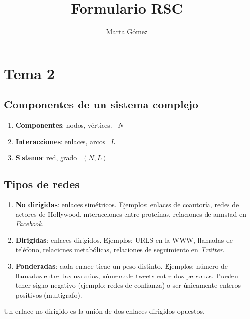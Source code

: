 \documentclass[10pt,spanish, landscape, twocolumn]{article}
\title{Formulario RSC}
\author{Marta Gómez}
\begin{document}
\renewcommand{\tablename}{Tabla}

\section{\textcolor{temados}{Tema 2}}
\subsection{\textcolor{temados}Componentes de un sistema complejo}
\begin{enumerate}[\color{temados}{$\heartsuit$}]
    \item \textbf{\textcolor{temados}{Componentes}}: nodos, vértices. \qquad\ $N$
    \item \textbf{\textcolor{temados}{Interacciones}}: enlaces, arcos \qquad\ $L$
    \item \textbf{\textcolor{temados}{Sistema}}: red, grado \qquad\ $(N,L)$
\end{enumerate}

\subsection{\textcolor{temados}Tipos de redes}
\begin{enumerate}[\color{temados}{$\bigstar$}]
    \item \textbf{\textcolor{temados}{No dirigidas}}: enlaces simétricos. Ejemplos: enlaces de coautoría, redes de actores de Hollywood, interacciones entre proteínas, relaciones de amistad en \textit{\textcolor{temados}{Facebook}}.
    \item \textbf{\textcolor{temados}{Dirigidas}}: enlaces dirigidos. Ejemplos: URLS en la WWW, llamadas de teléfono, relaciones metabólicas, relaciones de seguimiento en \textit{\textcolor{temados}{Twitter}}.
    \item \textbf{\textcolor{temados}{Ponderadas}}: cada enlace tiene un peso distinto. Ejemplos: número de llamadas entre dos usuarios, número de tweets entre dos personas. Pueden tener signo negativo (ejemplo: redes de confianza) o ser únicamente enteros positivos (multigrafo).
\end{enumerate}

Un enlace no dirigido es la unión de dos enlaces dirigidos opuestos.
\end{document}
